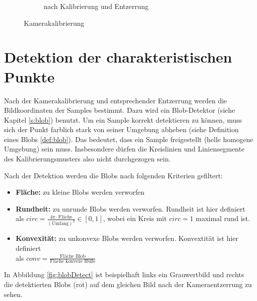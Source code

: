 \begin{figure}[!htb]
\begin{subfigure}{.5\textwidth}
	\caption{nach Kalibrierung und Entzerrung}
	\label{fig:calibUndist}
\end{subfigure}
\caption{Kamerakalibrierung}
\label{fig:calib}
\end{figure}

\section{Detektion der charakteristischen Punkte}

Nach der Kamerakalibrierung und entsprechender Entzerrung werden die Bildkoordinaten der Samples bestimmt. Dazu wird ein Blob-Detektor (siehe Kapitel \ref{s:blob}) benutzt.
Um ein Sample korrekt detektieren zu können, muss sich der Punkt farblich stark von seiner Umgebung abheben (siehe Definition eines Blobs \ref{def:blob}). Das bedeutet, dass ein Sample freigestellt (helle homogene Umgebung) sein muss. Insbesondere dürfen die Kreislinien und Liniensegmente des Kalibrierungsmusters also nicht durchgezogen sein.

Nach der Detektion werden die Blobs nach folgenden Kriterien gefiltert:

\begin{itemize}
	\item \textbf{Fläche:} zu kleine Blobs werden verworfen
	\item \textbf{Rundheit:} zu unrunde Blobs werden verworfen. Rundheit ist hier definiert als $circ = \frac{4\pi\cdot \textrm{Fläche}}{\left(\textrm{Umfang}\right)^2}\in[0,1]$, wobei ein Kreis mit $circ = 1$ maximal rund ist.
	\item  \textbf{Konvexität:} zu unkonvexe Blobs werden verworfen. Konvextität ist hier definiert \\als $conv = \frac{\textrm{Fläche Blob}}{\textrm{Fläche konvexe Hülle}}$
\end{itemize}

In Abbildung \ref{fig:blobDetect} ist beispielhaft links ein Grauwertbild und rechts die detektierten Blobs (rot) auf dem gleichen Bild nach der Kameraentzerrung zu sehen.


